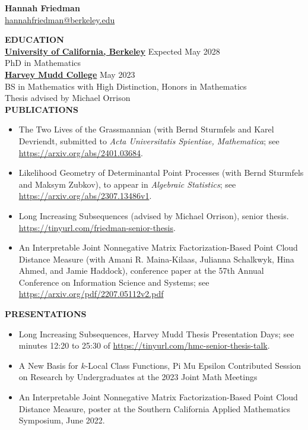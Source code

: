 \documentclass[11pt]{article}
\newcommand{\hdr}[1]{\textcolor{blue(ryb)}{\textbf{#1}}}
\begin{document}
\begin{center}
\hdr{\Large{Hannah Friedman}}\\
\url{hannahfriedman@berkeley.edu}\\
\end{center}
\medskip
\raggedright
\hdr{EDUCATION}\\
\textbf{\underline{University of California, Berkeley}} \hfill Expected May 2028\\
PhD in Mathematics\\
\textbf{\underline{Harvey Mudd College}} \hfill May 2023\\
BS in Mathematics with High Distinction, Honors in Mathematics\\
Thesis advised by Michael Orrison\\
\bigskip
\hdr{PUBLICATIONS}\\
\begin{itemize}
\item The Two Lives of the Grassmannian (with Bernd Sturmfels and Karel Devriendt, submitted to \textit{Acta Universitatis Spientiae, Mathematica}; see  \url{https://arxiv.org/abs/2401.03684}.
\item Likelihood Geometry of Determinantal Point Processes (with Bernd Sturmfels and Maksym Zubkov), to appear in \emph{Algebraic Statistics}; see  \url{https://arxiv.org/abs/2307.13486v1}.
\item Long Increasing Subsequences (advised by Michael Orrison), senior thesis.  \url{https://tinyurl.com/friedman-senior-thesis}.
\item An Interpretable Joint Nonnegative Matrix Factorization-Based Point Cloud Distance Measure (with Amani R. Maina-Kilaas, Julianna Schalkwyk, Hina Ahmed, and Jamie Haddock), conference paper at the 57th Annual Conference on Information Science and Systems; see \url{https://arxiv.org/pdf/2207.05112v2.pdf}
\end{itemize}
\hdr{PRESENTATIONS}\\
\begin{itemize}
\item Long Increasing Subsequences, Harvey Mudd Thesis Presentation Days; see minutes 12:20 to 25:30 of \url{https://tinyurl.com/hmc-senior-thesis-talk}.
\item A New Basis for $k$-Local Class Functions, Pi Mu Epsilon Contributed Session on Research by Undergraduates at the 2023 Joint Math Meetings
\item An Interpretable Joint Nonnegative Matrix Factorization-Based Point Cloud Distance Measure, poster at the Southern California Applied Mathematics Symposium, June 2022.
\end{itemize}
\end{document}
